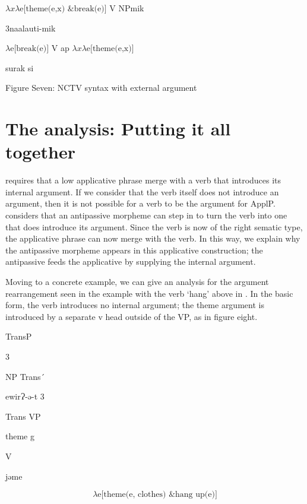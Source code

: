 \documentclass[output=paper,modfonts,nonflat]{langsci/langscibook}
\begin{document}
 $\mathit{\lambda x\lambda} \text{e[theme(e,x) \& break(e)]}$  V   NPmik

3naalauti-mik

 $\lambda \text{e[break(e)]}$                V      ap         $\mathit{\lambda x\lambda} \text{e[}\text{theme(e,x)]}$

             surak      si

\begin{stylecaption}
Figure Seven: NCTV syntax with external argument
\end{stylecaption}

\section{The analysis: Putting it all together} %

\citet{Pyllkänen2008} requires that a low applicative phrase merge with a verb that introduces its internal argument.  If we consider that the verb itself does not introduce an argument, then it is not possible for a verb to be the argument for ApplP.   \citet{Basilico2017} considers that an antipassive morpheme can step in to turn the verb into one that does introduce its argument.  Since the verb is now of the right sematic type, the applicative phrase can now merge with the verb. In this way, we explain why the antipassive morpheme appears in this applicative construction; the antipassive feeds the applicative by supplying the internal argument.

Moving to a concrete example, we can give an analysis for the argument rearrangement seen in the example with the verb ‘hang’ above in .  In the basic form, the verb introduces no internal argument; the theme argument is introduced by a separate v head outside of the VP, as in figure eight.

      TransP    

           3  

           NP        Trans´  

    ewirɁ-ǝ{}-t 3

         Trans      VP

         theme        g

                V

            jǝme

\begin{equation*}
\lambda \text{e[}\text{theme}\text{(e, clothes) \& hang}\text{ up}\text{(e)]}
\end{equation*}
\end{document}
